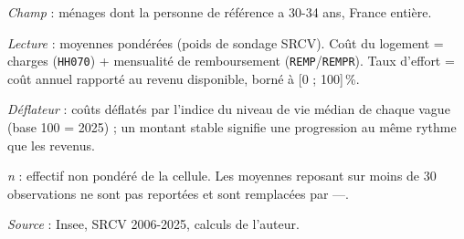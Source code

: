 \documentclass[12pt,a4paper]{article}
\begin{document}
\begin{table}[htbp]
\begin{threeparttable}
\begin{tabular}{lrrrrrrrrrr}
			\bottomrule
		\end{tabular}
		\begin{tablenotes}[flushleft]\scriptsize
			\item \textit{Champ} : ménages dont la personne de référence a 30-34 ans, France entière.
			\item \textit{Lecture} : moyennes pondérées (poids de sondage SRCV). Coût du logement =
			charges (\texttt{HH070}) + mensualité de remboursement (\texttt{REMP}/\texttt{REMPR}).
			Taux d'effort = coût annuel rapporté au revenu disponible, borné à [0 ; 100]\,\%.
			\item \textit{Déflateur} : coûts déflatés par l'indice du niveau de vie médian de chaque vague (base 100 = 2025) ; un montant stable signifie une progression au même rythme que les revenus.
			\item \textit{n} : effectif non pondéré de la cellule. Les moyennes reposant sur
			moins de 30 observations ne sont pas reportées et sont remplacées par ---.
			\item \textit{Source} : Insee, SRCV 2006-2025, calculs de l'auteur.
		\end{tablenotes}
	\end{threeparttable}
\end{table}
\end{document}
